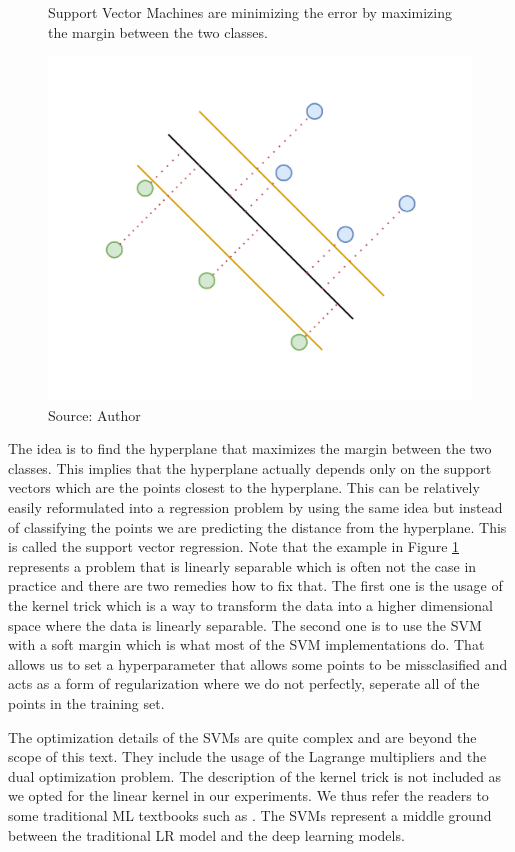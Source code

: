 \begin{figure}[!h]
    \centering
    \caption{Support Vector Machines are minimizing
    the error by maximizing the margin between the two classes.}
    \includegraphics[width=1\textwidth]{Figures/SVM_idea.drawio.png}
    \caption*{Source: Author}
    \label{fig:svm}
\end{figure}


The idea is to find the hyperplane that maximizes the margin between the two classes.
This implies that the hyperplane actually depends only on the support vectors which are the points
closest to the hyperplane. This can be relatively easily reformulated
into a regression problem by using the same idea but instead of classifying the points
we are predicting the distance from the hyperplane. This is called the support vector regression.
Note that the example in Figure \ref{fig:svm} represents a problem that is linearly separable
which is often not the case in practice and there are two remedies how to fix that.
The first one is the usage of the kernel trick which is a way to transform the data into a higher dimensional space
where the data is linearly separable. The second one is to use the \ac{SVM} with a soft margin which is
what most of the \ac{SVM} implementations do. That allows us to set a hyperparameter that allows
some points to be missclasified and acts as a form of regularization where we do not perfectly,
seperate all of the points in the training set. 


The optimization details of the \ac{SVM}s are quite complex and are beyond the scope of this text.
They include the usage of the Lagrange multipliers and the dual optimization problem. The description
of the kernel trick is not included as we opted for the linear kernel in our experiments.
We thus refer the readers to some traditional \ac{ML} textbooks such as \citep{bishop2006pattern}.
The \ac{SVM}s represent a middle ground between the traditional \ac{LR} model and the deep learning models.


